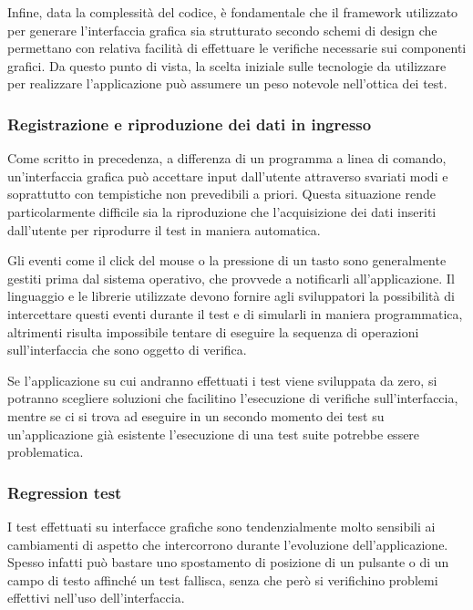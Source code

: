 Infine, data la complessità del codice, è fondamentale che il framework utilizzato per generare l'interfaccia grafica sia strutturato secondo schemi di design che permettano con relativa facilità di effettuare le verifiche necessarie sui componenti grafici. Da questo punto di vista, la scelta iniziale sulle tecnologie da utilizzare per realizzare l'applicazione può assumere un peso notevole nell'ottica dei test.

\subsubsection{Registrazione e riproduzione dei dati in ingresso}

Come scritto in precedenza, a differenza di un programma a linea di comando, un'interfaccia grafica può accettare input dall'utente attraverso svariati modi e soprattutto con tempistiche non prevedibili a priori. Questa situazione rende particolarmente difficile sia la riproduzione che l'acquisizione dei dati inseriti dall'utente per riprodurre il test in maniera automatica. 

Gli eventi come il click del mouse o la pressione di un tasto sono generalmente gestiti prima dal sistema operativo, che provvede a notificarli all'applicazione. Il linguaggio e le librerie utilizzate devono fornire agli sviluppatori la possibilità di intercettare questi eventi durante il test e di simularli in maniera programmatica, altrimenti risulta impossibile tentare di eseguire la sequenza di operazioni sull'interfaccia che sono oggetto di verifica.

Se l'applicazione su cui andranno effettuati i test viene sviluppata da zero, si potranno scegliere soluzioni che facilitino l'esecuzione di verifiche sull'interfaccia, mentre se ci si trova ad eseguire in un secondo momento dei test su un'applicazione già esistente l'esecuzione di una test suite potrebbe essere problematica.

\subsubsection{Regression test}

I test effettuati su interfacce grafiche sono tendenzialmente molto sensibili ai cambiamenti di aspetto che intercorrono durante l'evoluzione dell'applicazione. Spesso infatti può bastare uno spostamento di posizione di un pulsante o di un campo di testo affinché un test fallisca, senza che però si verifichino problemi effettivi nell'uso dell'interfaccia. 

